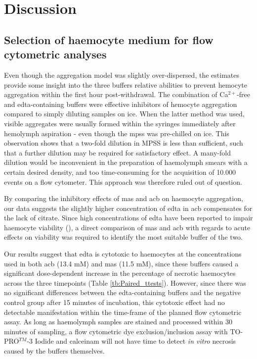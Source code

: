 \chapter{Discussion}
\label{chap:discuss}

\section{Selection of haemocyte medium for flow cytometric analyses}
Even though the aggregation model was slightly over-dispersed, the estimates provide some insight into the three buffers relative abilities to prevent hemocyte aggregation within the first hour post-withdrawal. The combination of Ca$^{2+}$-free and \acrshort{edta}-containing buffers were effective inhibitors of hemocyte aggregation compared to simply diluting samples on ice. When the latter method was used, visible aggregates were usually formed within the syringes immediately after hemolymph aspiration - even though the \acrshort{mpss} was pre-chilled on ice. This observation shows that a two-fold dilution in MPSS is less than sufficient, such that a further dilution may be required for satisfactory effect. A many-fold dilution would be inconvenient in the preparation of haemolymph smears with a certain desired density, and too time-consuming for the acquisition of 10.000 events on a flow cytometer. This approach was therefore ruled out of question.

By comparing the inhibitory effects of \acrshort{mas} and \acrshort{acb} on haemocyte aggregation, our data suggests the slightly higher concentration of \acrshort{edta} in \acrshort{acb} compensates for the lack of citrate. Since high concentrations of \acrshort{edta} have been reported to impair haemocyte viability (\cite{Grandiosa2018, Burkhard2009}), a direct comparison of \acrshort{mas} and \acrshort{acb} with regards to acute effects on viability was required to identify the most suitable buffer of the two.

Our results suggest that \acrshort{edta} is cytotoxic to haemocytes at the concentrations used in both \acrshort{acb} (13.4 mM) and \acrshort{mas} (11.5 mM), since these buffers caused a significant dose-dependent increase in the percentage of necrotic haemocytes across the three timepoints (Table \ref{tb:Paired_ttests}). However, since there was no significant differences between the \acrshort{edta}-containing buffers and the negative control group after 15 minutes of incubation, this cytotoxic effect had no detectable manifestation within the time-frame of the planned flow cytometric assay. As long as haemolymph samples are stained and processed within 30 minutes of sampling, a flow cytometric dye exclusion/inclusion assay with TO-PRO$^{TM}$-3 Iodide and \acrshort{calceinam} will not have time to detect \emph{in vitro} necrosis caused by the buffers themselves.

